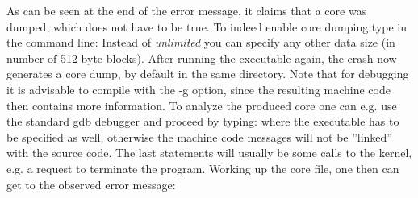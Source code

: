 As can be seen at the end of the error message, it claims that a core was dumped, which does not have to be true. To indeed enable core dumping type in the command line:
Instead of \emph{unlimited} you can specify any other data size (in number of 512-byte blocks). After running the executable again, the crash now generates a core dump, by default in the same directory. Note that for debugging it is advisable to compile with the -g option, since the resulting machine code then contains more information. To analyze the produced core one can e.g. use the standard gdb debugger and proceed by typing:
where the executable has to be specified as well, otherwise the machine code messages will not be ''linked'' with the source code. The last statements will usually be some calls to the kernel, e.g. a request to terminate the program. Working up the core file, one then can get to the observed error message:

